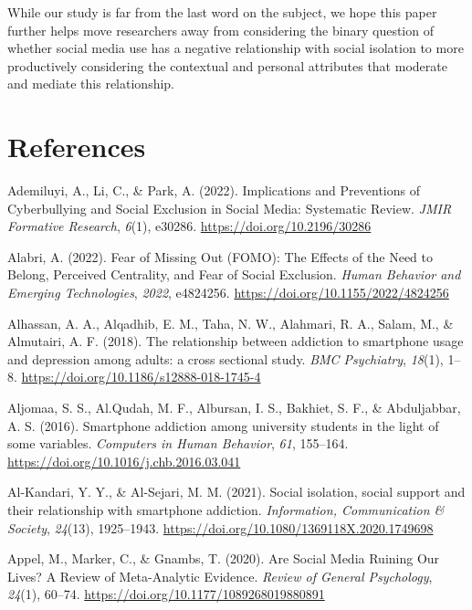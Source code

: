 \documentclass[
  letterpaper,
  DIV=11,
  numbers=noendperiod]{scrartcl}
\newlength{\cslhangindent}
\newenvironment{CSLReferences}[2] %
 {\begin{list}{}{%
  \setlength{\itemindent}{0pt}
  \setlength{\leftmargin}{0pt}
  \setlength{\parsep}{0pt}
  \ifodd #1
   \setlength{\leftmargin}{\cslhangindent}
   \setlength{\itemindent}{-1\cslhangindent}
  \fi
  \setlength{\itemsep}{#2\baselineskip}}}
 {\end{list}}
\begin{document}
While our study is far from the last word on the subject, we hope this
paper further helps move researchers away from considering the binary
question of whether social media use has a negative relationship with
social isolation to more productively considering the contextual and
personal attributes that moderate and mediate this relationship.

\newpage{}

\section{References}\label{references}

\label{refs}
\begin{CSLReferences}{1}{0}
Ademiluyi, A., Li, C., \& Park, A. (2022). Implications and Preventions
of Cyberbullying and Social Exclusion in Social Media: Systematic
Review. \emph{JMIR Formative Research}, \emph{6}(1), e30286.
\url{https://doi.org/10.2196/30286}

Alabri, A. (2022). Fear of Missing Out (FOMO): The Effects of the Need
to Belong, Perceived Centrality, and Fear of Social Exclusion.
\emph{Human Behavior and Emerging Technologies}, \emph{2022}, e4824256.
\url{https://doi.org/10.1155/2022/4824256}

Alhassan, A. A., Alqadhib, E. M., Taha, N. W., Alahmari, R. A., Salam,
M., \& Almutairi, A. F. (2018). The relationship between addiction to
smartphone usage and depression among adults: a cross sectional study.
\emph{BMC Psychiatry}, \emph{18}(1), 1--8.
\url{https://doi.org/10.1186/s12888-018-1745-4}

Aljomaa, S. S., Al.Qudah, M. F., Albursan, I. S., Bakhiet, S. F., \&
Abduljabbar, A. S. (2016). Smartphone addiction among university
students in the light of some variables. \emph{Computers in Human
Behavior}, \emph{61}, 155--164.
\url{https://doi.org/10.1016/j.chb.2016.03.041}

Al-Kandari, Y. Y., \& Al-Sejari, M. M. (2021). Social isolation, social
support and their relationship with smartphone addiction.
\emph{Information, Communication \& Society}, \emph{24}(13), 1925--1943.
\url{https://doi.org/10.1080/1369118X.2020.1749698}

Appel, M., Marker, C., \& Gnambs, T. (2020). Are Social Media Ruining
Our Lives? A Review of Meta-Analytic Evidence. \emph{Review of General
Psychology}, \emph{24}(1), 60--74.
\url{https://doi.org/10.1177/1089268019880891}


\end{CSLReferences}
\end{document}

